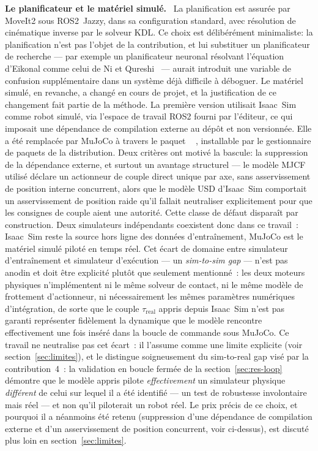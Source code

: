\documentclass[a4paper, oneside]{article}
\newcommand{\parag}[1]{%
    \par\medskip\noindent\textbf{#1}\ \ignorespaces%
}
\newcommand{\code}[1]{%
    \mbox{\ttfamily\small%
        \detokenize{#1}%
    }%
}
\newcommand{\taureal}{\ensuremath{\tau_{\mathrm{real}}}}
\begin{document}
\parag{Le planificateur et le matériel simulé.} La planification est assurée
par MoveIt2 sous ROS2~Jazzy, dans sa configuration standard, avec résolution de
cinématique inverse par le solveur KDL. Ce choix est délibérément
minimaliste: la planification n'est pas l'objet de la contribution, et lui
substituer un planificateur de recherche — par exemple un planificateur
neuronal résolvant l'équation d'Eikonal comme celui de
Ni et Qureshi~\cite{ni2024} — aurait introduit une variable de confusion
supplémentaire dans un système déjà difficile à déboguer. Le matériel simulé, en
revanche, a changé en cours de projet, et la justification de ce changement fait
partie de la méthode. La première version utilisait Isaac~Sim comme robot
simulé, via l'espace de travail ROS2 fourni par l'éditeur, ce qui imposait une
dépendance de compilation externe au dépôt et non versionnée. Elle a été
remplacée par MuJoCo à travers le paquet \code{mujoco_ros2_control}, installable
par le gestionnaire de paquets de la distribution. Deux critères ont motivé la
bascule: la suppression de la dépendance externe, et surtout un avantage
structurel — le modèle MJCF utilisé déclare un actionneur de couple direct
unique par axe, sans asservissement de position interne concurrent, alors que le
modèle USD d'Isaac~Sim comportait un asservissement de position raide qu'il
fallait neutraliser explicitement pour que les consignes de couple aient une
autorité. Cette classe de défaut disparaît par construction. Deux simulateurs
indépendants coexistent donc dans ce travail~: Isaac~Sim reste la source hors
ligne des données d'entraînement, MuJoCo est le \og matériel simulé \fg{}
piloté en temps réel. Cet écart de domaine entre simulateur d'entraînement et
simulateur d'exécution — un \emph{sim-to-sim gap} — n'est pas anodin et doit
être explicité plutôt que seulement mentionné~: les deux moteurs physiques
n'implémentent ni le même solveur de contact, ni le même modèle de frottement
d'actionneur, ni nécessairement les mêmes paramètres numériques d'intégration,
de sorte que le couple $\taureal$ appris depuis Isaac~Sim n'est pas
garanti représenter fidèlement la dynamique que le modèle rencontre effectivement
une fois inséré dans la boucle de commande sous MuJoCo. Ce travail ne
neutralise pas cet écart~: il l'assume comme une limite explicite (voir
section~\ref{sec:limites}), et le distingue soigneusement du sim-to-real
gap visé par la contribution~4~: la validation en boucle fermée de
la section~\ref{sec:res-loop} démontre que le modèle appris pilote
\emph{effectivement} un simulateur physique \emph{différent} de celui sur
lequel il a été identifié — un test de robustesse involontaire mais réel — et
non qu'il piloterait un robot réel. Le prix précis de ce choix, et pourquoi il
a néanmoins été retenu (suppression d'une dépendance de compilation externe et
d'un asservissement de position concurrent, voir ci-dessus), est discuté plus
loin en section~\ref{sec:limites}.
\end{document}

